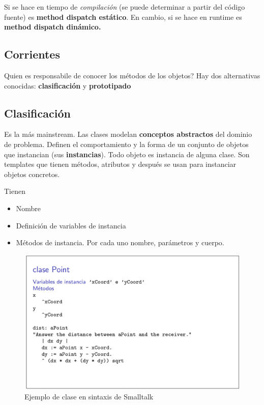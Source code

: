 \documentclass{report}
\theoremstyle{definition} %
\begin{document}
Si se hace en tiempo de \textit{compilación} (se puede determinar a partir del
código fuente) es \textbf{method dispatch estático}. En cambio, si se hace en
runtime es \textbf{method dispatch dinámico.}

\subsection{Corrientes}

Quien es responsabile de conocer los métodos de los objetos? Hay dos
alternativas conocidas: \textbf{clasificación} y \textbf{prototipado}

\subsection{Clasificación}

Es la más mainstream. Las clases modelan \textbf{conceptos abstractos} del
dominio de problema. Definen el comportamiento y la forma de un conjunto de
objetos que instancian (sus \textbf{instancias}). Todo objeto es instancia de
alguna clase. Son templates que tienen métodos, atributos y después se usan para
instanciar objetos concretos.

Tienen

\begin{itemize}
    \item Nombre
    \item Definición de variables de instancia
    \item Métodos de instancia. Por cada uno nombre, parámetros y cuerpo.
\end{itemize}

\begin{figure}[H]
    \centering
    \includegraphics[scale=0.25]{img/poo/st-point.png}
    \caption{Ejemplo de clase en sintaxis de Smalltalk}
\end{figure}
\end{document}

